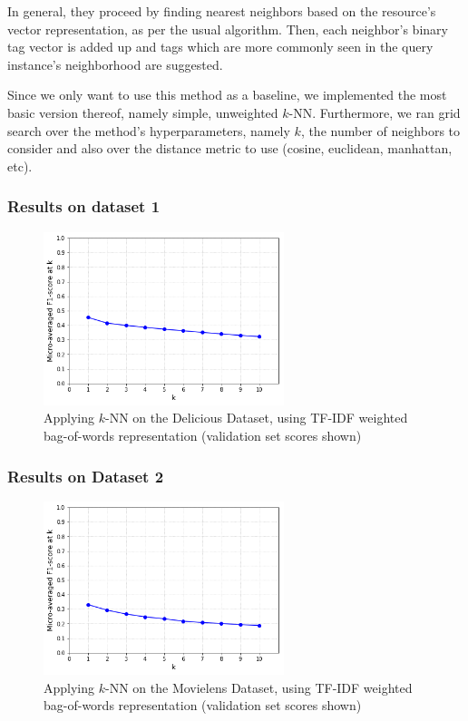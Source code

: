 In general, they proceed by finding nearest neighbors based on the resource's vector representation, as per the usual algorithm. Then, each neighbor's binary tag vector is added up and tags which are more commonly seen in the query instance's neighborhood are suggested.

Since we only want to use this method as a baseline, we implemented the most basic version thereof, namely simple, unweighted $k$-NN. Furthermore, we ran grid search over the method's hyperparameters, namely $k$, the number of neighbors to consider and also over the distance metric to use (cosine, euclidean, manhattan, etc).

\subsubsection{Results on dataset 1}

\begin{figure}[H]
    \centering
    \includegraphics[width=7cm]{chapters/05_experiments/images/knn-tfidf-delicious.png}
    \caption{Applying $k$-NN on the Delicious Dataset, using TF-IDF weighted bag-of-words representation (validation set scores shown)}
    \label{fig:knn__movielens}
\end{figure}

\subsubsection{Results on Dataset 2}

\begin{figure}[H]
    \centering
    \includegraphics[width=7cm]{chapters/05_experiments/images/knn-tfidf-movielens.png}
    \caption{Applying $k$-NN on the Movielens Dataset, using TF-IDF weighted bag-of-words representation (validation set scores shown)}
    \label{fig:knn__movielens}
\end{figure}

